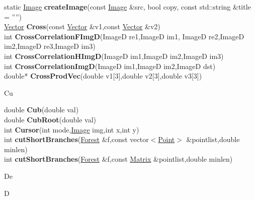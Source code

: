\documentclass[10pt,titlepage]{article}
\def\functionlistentry#1#2#3#4#5#6{\noindent #1 {\bf #2}(#3) \dotfill #6\\}
\def\letterref#1{}
\def\letterlabel#1{\vspace{0.5cm}\centerline{\Large #1}}
\def\letterlabelend#1{}
\begin{document}
{{\letterref{Ca}
\letterref{Ce}
\letterref{Ch}
\letterref{Ci}
\letterref{Cl}
\letterref{Co}
\letterref{Cr}
\letterref{Cu}
\letterlabelend{Cr}
\functionlistentry{static \hyperlink{Image}{Image}}{createImage}{const \hyperlink{Image}{Image} \&src, bool copy, const std::string \&title = ''''}{9}{Images}{}
\functionlistentry{\hyperlink{Vector}{Vector}}{Cross}{const \hyperlink{Vector}{Vector} \&v1,const \hyperlink{Vector}{Vector} \&v2}{254}{datastructures}{}
\functionlistentry{int}{CrossCorrelationFImgD}{ImageD re1,ImageD im1, ImageD re2,ImageD im2,ImageD re3,ImageD im3}{1224}{signalTrafo}{}
\functionlistentry{int}{CrossCorrelationHImgD}{ImageD im1,ImageD im2,ImageD im3}{1225}{signalTrafo}{}
\functionlistentry{int}{CrossCorrelationImgD}{ImageD im1,ImageD im2,ImageD dst}{1223}{signalTrafo}{}
\functionlistentry{double*}{CrossProdVec}{double v1[3],double v2[3],double v3[3]}{1563}{obsolet}{}

\letterlabel{Cu}
\letterref{A}
\letterref{B}
\letterref{C}
\letterref{D}
\letterref{E}
\letterref{F}
\letterref{G}
\letterref{H}
\letterref{I}
\letterref{K}
\letterref{L}
\letterref{M}
\letterref{N}
\letterref{O}
\letterref{P}
\letterref{Q}
\letterref{R}
\letterref{S}
\letterref{T}
\letterref{U}
\letterref{V}
\letterref{W}
\letterref{X}
\letterref{Y}
\letterref{Z}

\letterref{Ca}
\letterref{Ce}
\letterref{Ch}
\letterref{Ci}
\letterref{Cl}
\letterref{Co}
\letterref{Cr}
\letterref{Cu}
\letterlabelend{Cu}
\functionlistentry{double}{Cub}{double val}{1346}{numeric}{}
\functionlistentry{double}{CubRoot}{double val}{1347}{numeric}{}
\functionlistentry{int}{Cursor}{int mode,\hyperlink{Image}{Image} img,int x,int y}{95}{Visualisierung}{}
\functionlistentry{int}{cutShortBranches}{\hyperlink{Forest}{Forest} \&f,const vector$<$\hyperlink{Point}{Point}$>$ \&pointlist,double minlen}{1298}{graph}{}
\functionlistentry{int}{cutShortBranches}{\hyperlink{Forest}{Forest} \&f,const \hyperlink{Matrix}{Matrix} \&pointlist,double minlen}{1299}{graph}{}

\letterlabel{De}
\letterlabel{D}
\letterref{A}
\letterref{B}
\letterref{C}
\letterref{D}
\letterref{E}
\letterref{F}
\letterref{G}
\letterref{H}
\letterref{I}
\letterref{K}
\letterref{L}
\letterref{M}
\letterref{N}
\letterref{O}
\letterref{P}
\letterref{Q}
\letterref{R}
\letterref{S}
\letterref{T}
\letterref{U}
\letterref{V}
\letterref{W}
\letterref{X}
\letterref{Y}
\letterref{Z}

}}
\end{document}
